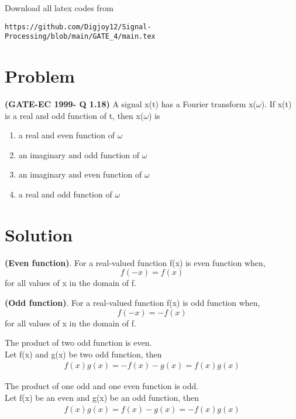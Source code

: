 \documentclass[journal,12pt,twocolumn]{IEEEtran}
\begin{document}
%
Download all latex codes from 
%
\begin{lstlisting}
https://github.com/Digjoy12/Signal-Processing/blob/main/GATE_4/main.tex
\end{lstlisting}
\section*{\textbf{Problem}}
\textbf{(GATE-EC 1999- Q 1.18)} A signal x(t) has a Fourier transform x($\omega$). If x(t) is a real and odd function of t, then x($\omega$) is
\begin{enumerate}[label=(\alph*)]
    \item a real and even function of $\omega$
    \item an imaginary and odd function of $\omega$
    \item an imaginary and even function of $\omega$
    \item a real and odd function of $\omega$
\end{enumerate}
\section*{\textbf{Solution}}
\begin{definition}{\textbf{(Even function)}}.
 For a real-valued function f(x) is even function when,
 \begin{equation}
     f(-x) = f(x)
 \end{equation}
 for all values of x in the domain of f.
\end{definition}
\begin{definition}{\textbf{(Odd function)}}.
 For a real-valued function f(x) is odd function when,
 \begin{equation}
     f(-x) = -f(x)
 \end{equation}
 for all values of x in the domain of f.
\end{definition}
\begin{corollary}\label{0.1}
The product of two odd function is even.\\
Let f(x) and g(x) be two odd function, then
\begin{align}
    f(x)g(x) = -f(x)-g(x) = f(x)g(x)
\end{align}
\end{corollary}
\begin{corollary}\label{0.2}
The product of one odd and one even function is odd.\\
Let f(x) be an even and g(x) be an odd function, then
\begin{align}
    f(x)g(x) = f(x)-g(x) = -f(x)g(x)
\end{align}
\end{corollary}
\end{document}
